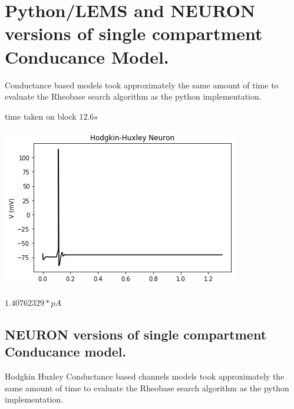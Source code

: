 \section{Python/LEMS and NEURON versions of single compartment Conducance Model.}

Conductance based models took approximately the same amount of
time to evaluate the Rheobase search algorithm as the python
implementation.


time taken on block $ 12.6s $

\begin{center}
\includegraphics{figures/backend_check_files/backend_check_22_2}
\end{center}

$ 1.40762329 * pA $


\subsection{NEURON versions of single compartment Conducance
model.}

Hodgkin Huxley Conductance based channels models took approximately the same amount of time to evaluate the Rheobase search algorithm as the python implementation.



